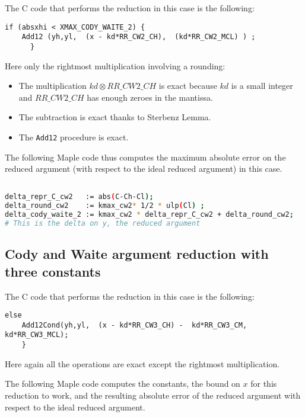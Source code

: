 The C code that performs the reduction in this case is the following:

\begin{lstlisting}[caption={Cody and Waite argument reduction with two
    constants},firstnumber=1]
      if (absxhi < XMAX_CODY_WAITE_2) { 
	Add12 (yh,yl,  (x - kd*RR_CW2_CH),  (kd*RR_CW2_MCL) ) ;
      }
\end{lstlisting}

Here only the rightmost multiplication involving a rounding: 
\begin{itemize}
\item The multiplication $\mathit{kd}\otimes \mathit{RR\_CW2\_CH}$ is
  exact because $kd$ is a small integer and $\mathit{RR\_CW2\_CH}$
  has enough zeroes in the mantissa.
\item The subtraction is exact thanks to Sterbenz Lemma.
\item The \texttt{Add12} procedure is exact.
\end{itemize}

The following Maple code thus computes the maximum absolute error on
the reduced argument (with respect to the ideal reduced argument) in
this case.
\begin{lstlisting}[caption={Computing constants for Cody and Waite 2},
  firstnumber=1,  language={sh}]% of course it's maple

delta_repr_C_cw2   := abs(C-Ch-Cl);
delta_round_cw2    := kmax_cw2* 1/2 * ulp(Cl) ;
delta_cody_waite_2 := kmax_cw2 * delta_repr_C_cw2 + delta_round_cw2;
# This is the delta on y, the reduced argument
\end{lstlisting}


\subsection{Cody and Waite argument reduction with three constants}
The C code that performs the reduction in this case is the following:

\begin{lstlisting}[caption={Cody and Waite argument reduction with three 
    constants},firstnumber=1]
      else 
	Add12Cond(yh,yl,  (x - kd*RR_CW3_CH) -  kd*RR_CW3_CM,   kd*RR_CW3_MCL);
    }
\end{lstlisting}

Here again all the operations are exact except the rightmost multiplication. 

The following Maple code computes the constants, the bound on $x$ for
this reduction to work, and the resulting absolute error of the reduced
argument with respect to the ideal reduced argument.

